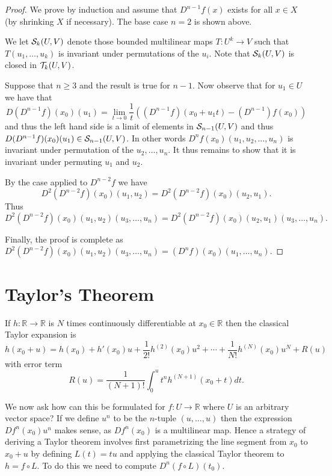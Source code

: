 \documentclass[twoside, a4paper, 10pt]{amsart}
\begin{document}
\begin{proof} We prove by induction and assume that $D^{n-1}f(x)$ exists for all $x \in X$ (by shrinking $X$ if necessary). The base case $n=2$ is shown above. 

We let $\mathcal{S}_{k}(U,V)$ denote those bounded multilinear maps $T:U^k \to V$ such that $T(u_1, \ldots, u_k)$ is invariant under permutations of the $u_i$. Note that $\mathcal{S}_{k}(U,V)$ is closed in $\mathcal{T}_k(U,V)$.

Suppose that $n \geq 3$ and the result is true for $n-1$. 
Now observe that for $u_1 \in U$ we have that  $$D(D^{n-1}f)(x_0)(u_1) = \lim_{t \to 0} \frac{1}{t}\left( (D^{n-1}f)(x_0 + u_1t) - (D^{n-1})f(x_0) \right)$$ and thus the left hand side is a limit of elements in $\mathcal{S}_{n-1}(U,V)$ and thus $D(D^{n-1}f)(x_0)(u_1) \in \mathcal{S}_{n-1}(U,V)$. In other words $D^{n}f(x_0)(u_1, u_2, \ldots, u_n)$ is invariant under permutation of the $u_2, \ldots, u_n$. It thus remains to show that it is invariant under permuting $u_1$ and $u_2$.

By the case applied to $D^{n-2}f$ we have $$D^2(D^{n-2}f)(x_0)(u_1,u_2) = D^2(D^{n-2}f)(x_0)(u_2,u_1).$$
Thus $$D^2(D^{n-2}f)(x_0)(u_1,u_2)(u_3, \ldots, u_n) = D^2(D^{n-2}f)(x_0)(u_2,u_1)(u_3, \ldots, u_n).$$

Finally, the proof is complete as $D^2(D^{n-2}f)(x_0)(u_1,u_2)(u_3, \ldots, u_n) = (D^{n}f)(x_0)(u_1, \ldots, u_n)$.
\end{proof}

\section{Taylor's Theorem}

If $h: \mathbb{R} \to \mathbb{R}$ is $N$ times continuously differentiable at $x_0 \in \mathbb{R}$ then the classical Taylor expansion is $$h(x_0 + u) = h(x_0) + h'(x_0)u + \frac{1}{2!}h^{(2)}(x_0)u^2 + \cdots + \frac{1}{N!}h^{(N)}(x_0)u^N + R(u)$$ with error term $$R(u) = \frac{1}{(N+1)!} \int_{0}^u t^n h^{(N+1)}(x_0 + t) dt.$$ 

We now ask how can this be formulated for $f:U \to \mathbb{R}$ where $U$ is an arbitrary vector space? If we define $u^n$ to be the $n$-tuple $(u, \ldots, u)$ then the expression $Df^n(x_0) u^n$ makes sense, as $Df^n(x_0)$ is a multilinear map. Hence a strategy of deriving a Taylor theorem involves first parametrizing the line segment from $x_0$ to $x_0 + u$ by defining $L(t) = tu$ and applying the classical Taylor theorem to $h = f \circ L$. To do this we need to compute $D^n(f \circ L) (t_0)$. 
\end{document}
